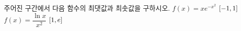 주어진 구간에서 다음 함수의 최댓값과 최솟값을 구하시오.
 $f(x)=xe^{-x^2}$ $[-1{,}\mkern3mu\mathopen{}1]$
 $f(x)=\dfrac{\ln x}{x^2}$ $[1{,}\mkern3mu\mathopen{}e]$
